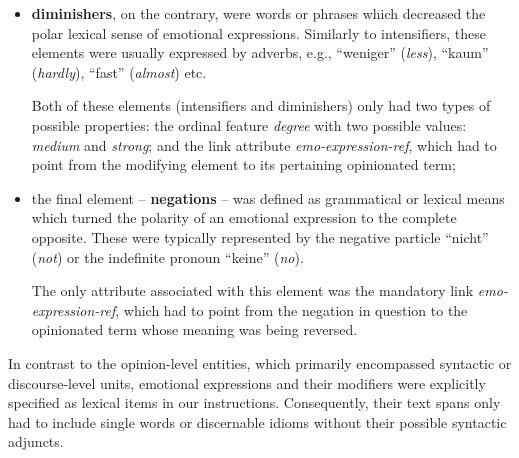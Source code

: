 \begin{itemize}
\item
  \textbf{diminishers}, on the contrary, were words or phrases which
  decreased the polar lexical sense of emotional expressions.
  Similarly to intensifiers, these elements were usually expressed by
  adverbs, e.g., ``weniger'' (\emph{less}), ``kaum'' (\emph{hardly}),
  ``fast'' (\emph{almost}) etc.

  Both of these elements (intensifiers and diminishers) only had two
  types of possible properties: the ordinal feature \emph{degree} with
  two possible values: \emph{medium} and \emph{strong}; and the link
  attribute \emph{emo-expression-ref}, which had to point from the
  modifying element to its pertaining opinionated term;

\item
  the final element -- \textbf{negations} -- was defined as
  grammatical or lexical means which turned the polarity of an
  emotional expression to the complete opposite.  These were typically
  represented by the negative particle ``nicht'' (\emph{not}) or the
  indefinite pronoun ``keine'' (\emph{no}).

  The only attribute associated with this element was the mandatory
  link \emph{emo-expression-ref}, which had to point from the negation
  in question to the opinionated term whose meaning was being
  reversed.
\end{itemize}

In contrast to the opinion-level entities, which primarily encompassed
syntactic or discourse-level units, emotional expressions and their
modifiers were explicitly specified as lexical items in our
instructions.  Consequently, their text spans only had to include
single words or discernable idioms without their possible syntactic
adjuncts.

